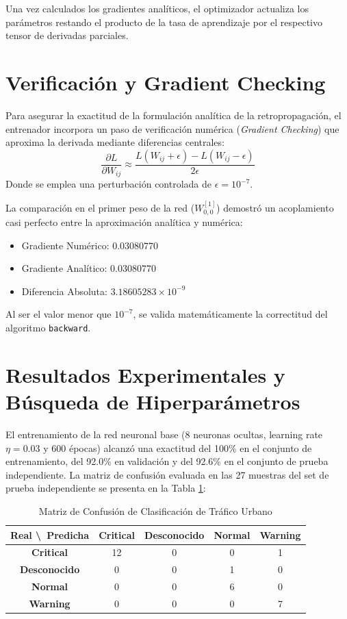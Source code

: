 \documentclass[11pt,a4paper]{article}
\begin{document}
Una vez calculados los gradientes analíticos, el optimizador actualiza los parámetros restando el producto de la tasa de aprendizaje por el respectivo tensor de derivadas parciales.

\section*{Verificación y Gradient Checking}
Para asegurar la exactitud de la formulación analítica de la retropropagación, el entrenador incorpora un paso de verificación numérica (\textit{Gradient Checking}) que aproxima la derivada mediante diferencias centrales:
\begin{equation}
    \frac{\partial L}{\partial W_{ij}} \approx \frac{L(W_{ij} + \epsilon) - L(W_{ij} - \epsilon)}{2\epsilon}
\end{equation}
Donde se emplea una perturbación controlada de $\epsilon = 10^{-7}$. 

La comparación en el primer peso de la red ($W^{[1]}_{0,0}$) demostró un acoplamiento casi perfecto entre la aproximación analítica y numérica:
\begin{itemize}
    \item Gradiente Numérico: $0.03080770$
    \item Gradiente Analítico: $0.03080770$
    \item Diferencia Absoluta: $3.18605283 \times 10^{-9}$
\end{itemize}
Al ser el valor menor que $10^{-7}$, se valida matemáticamente la correctitud del algoritmo \texttt{backward}.

\section*{Resultados Experimentales y Búsqueda de Hiperparámetros}
El entrenamiento de la red neuronal base (8 neuronas ocultas, learning rate $\eta = 0.03$ y 600 épocas) alcanzó una exactitud del 100\% en el conjunto de entrenamiento, del 92.0\% en validación y del 92.6\% en el conjunto de prueba independiente. La matriz de confusión evaluada en las 27 muestras del set de prueba independiente se presenta en la Tabla \ref{tab:confusion}:

\begin{table}[h]
\centering
\caption{Matriz de Confusión de Clasificación de Tráfico Urbano}
\label{tab:confusion}
\begin{tabular}{ccccc}
\toprule
\textbf{Real \textbackslash\ Predicha} & \textbf{Critical} & \textbf{Desconocido} & \textbf{Normal} & \textbf{Warning} \\
\midrule
\textbf{Critical} & 12 & 0 & 0 & 1 \\
\textbf{Desconocido} & 0 & 0 & 1 & 0 \\
\textbf{Normal} & 0 & 0 & 6 & 0 \\
\textbf{Warning} & 0 & 0 & 0 & 7 \\
\bottomrule
\end{tabular}
\end{table}
\end{document}
